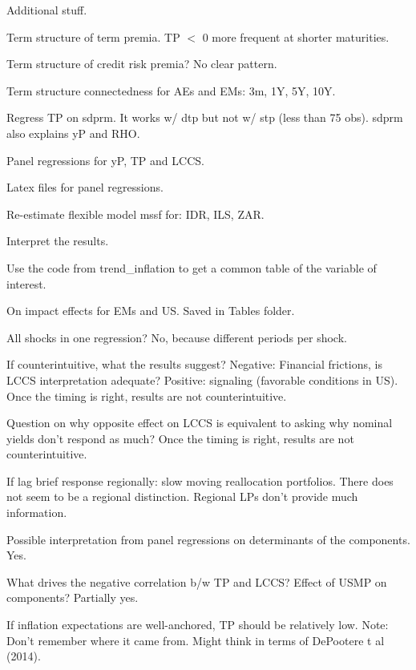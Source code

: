 \documentclass[12pt]{article}
\newcommand{\cmark}{\ding{51}}
\newcommand{\xmark}{\ding{55}}
\newcommand{\done}{\rlap{$\square$}{\raisebox{2pt}{\large\hspace{1pt}\cmark}}%
	\hspace{-2.5pt}}
\newcommand{\wontdo}{\rlap{$\square$}{\large\hspace{1pt}\xmark}}
\begin{document}
\begin{todolist}
	\item[\done] Additional stuff.
	\begin{todolist}
		\item[\done] Term structure of term premia. TP \(<\) 0 more frequent at shorter maturities.
		\item[\done] Term structure of credit risk premia? No clear pattern.
		\item[\done] Term structure connectedness for AEs and EMs: 3m, 1Y, 5Y, 10Y.
		\item[\done] Regress TP on sdprm. It works w/ dtp but not w/ stp (less than 75 obs). sdprm also explains yP and RHO.
		\item[\done] Panel regressions for yP, TP and LCCS.
		\item[\done] Latex files for panel regressions.
		\item[\done] Re-estimate flexible model mssf for: IDR, ILS, ZAR.
	\end{todolist}
	\item[\done] Interpret the results.
	\begin{todolist}
		\item[\done] Use the code from trend_inflation to get a common table of the variable of interest.
		\item[\done] On impact effects for EMs and US. Saved in Tables folder.
		\item[\wontdo] All shocks in one regression? No, because different periods per shock.
		\item[\wontdo] If counterintuitive, what the results suggest? Negative: Financial frictions, is LCCS interpretation adequate? Positive: signaling (favorable conditions in US). Once the timing is right, results are not counterintuitive.
		\item[\wontdo] Question on why opposite effect on LCCS is equivalent to asking why nominal yields don't respond as much? Once the timing is right, results are not counterintuitive.
		\item[\wontdo] If lag brief response regionally: slow moving reallocation portfolios. There does not seem to be a regional distinction. Regional LPs don't provide much information.
		\item[\done] Possible interpretation from panel regressions on determinants of the components. Yes.
		\item[\done] What drives the negative correlation b/w TP and LCCS? Effect of USMP on components? Partially yes.
		\item[\wontdo] If inflation expectations are well-anchored, TP should be relatively low. Note: Don't remember where it came from. Might think in terms of DePootere t al (2014).

\end{todolist}
\end{todolist}
\end{document}
